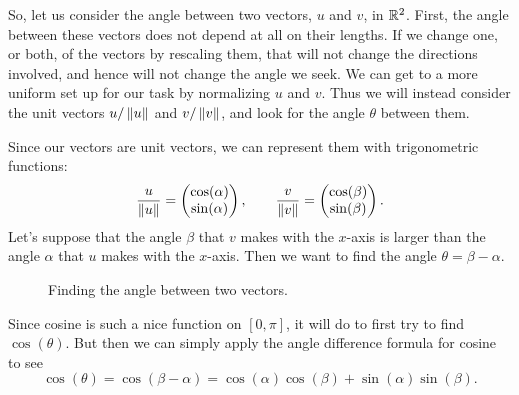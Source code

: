 \documentclass[00-livre-main.tex]{subfiles}
\begin{document}
So, let us consider the angle between two vectors, $u$ and $v$, in $\mathbb{R}^2$. 
First, the angle between these vectors does not depend at all on their lengths. 
If we change one, or both, of the vectors by rescaling them, that will not change the directions involved, and hence will not change the angle we seek. 
We can get to a more uniform set up for our task by normalizing $u$ and $v$. 
Thus we will instead consider the unit vectors $u/\left\|u\right\|$ and $v/\left\|v\right\|$, and look for the angle $\theta$ between them.

Since our vectors are unit vectors, we can represent them with trigonometric functions:
\[
\frac{u}{\left\|u\right\|} = \begin{pmatrix} \cos(\alpha)\\ \sin(\alpha) \end{pmatrix}, \qquad
\frac{v}{\left\|v\right\|} = \begin{pmatrix} \cos(\beta)\\ \sin(\beta) \end{pmatrix}.
\]
Let's suppose that the angle $\beta$ that $v$ makes with the $x$-axis is larger than the angle $\alpha$ that $u$ makes with the $x$-axis. Then we want to find the angle $\theta = \beta-\alpha$. 

\begin{figure}[h]
\centering
{}
\caption{Finding the angle between two vectors.}
\label{fig:angle-computation}
\end{figure}


Since cosine is such a nice function on $[0,\pi]$, it will do to first try to find $\cos(\theta)$. But then we can simply apply the angle difference formula for cosine to see
\[
\cos(\theta) = \cos(\beta - \alpha) = \cos(\alpha)\cos(\beta) + \sin(\alpha)\sin(\beta).
\]
\end{document}
